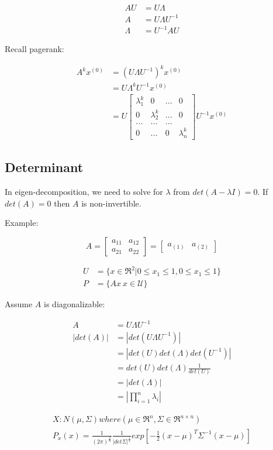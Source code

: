 \begin{align*}
AU &= U\Lambda\\
A &= U\Lambda U^{-1}\\
\Lambda &= U^{-1}AU
\end{align*}

Recall pagerank:

\begin{align*}
A^kx^{(0)} &= (U\Lambda U^{-1})^kx^{(0)}\\
&=U\Lambda^kU^{-1}x^{(0)} \\
&= U
\begin{bmatrix}
\lambda_1^k & 0 & ... & 0\\
0& \lambda_2^k  &  ... & 0\\
...  & ...  &   ...& \\
0    &  ... &  0 & \lambda_n^k
\end{bmatrix} U^{-1}x^{(0)}
\end{align*}

\subsection{Determinant}

In eigen-decomposition, we need to solve for $\lambda$ from $det(A - \lambda I) = 0$. 
If $det(A) = 0$ then $A$ is non-invertible. 

Example:

$$A = 
\left[
\begin{matrix}
a_{11} & a_{12}\\
a_{21} & a_{22}
\end{matrix}
\right] =
\left[
\begin{matrix}
a_{(1)} & a_{(2)}
\end{matrix}
\right]
$$

\begin{align*}
U &= \{x\in \Re^2 | 0\leq x_1 \leq 1, 0\leq x_1 \leq 1 \}\\
P &= \{Ax \ x\in \mathcal{U}\} 
\end{align*}


\begin{figure}
	\centering
	\resizebox{7.5cm}{3cm}{}
	\caption{}
	\label{}
\end{figure}

Assume $A$ is diagonalizable:

\begin{align*}
A &= U\Lambda U^{-1}\\
|det(A)| &= |det(U\Lambda U^{-1})| \\
&= |det(U)det(\Lambda)det(U^{-1})|\\
&= det(U)det(\Lambda)\frac{1}{det(U)}\\
&= |det(\Lambda)|\\
&= |\prod^n_{i=1}\lambda_i|
\end{align*}

\begin{align*}
X: N(\mu, \Sigma)where(\mu \in \Re^n, \Sigma \in \Re^{n\times n})\\
P_x(x) = \frac{1}{(2\pi)^{\frac{2}{n}}}\frac{1}{|det\Sigma|^{\frac{1}{2}}}exp[-\frac{1}{2}(x - \mu)^T\Sigma^{-1}(x - \mu)]
\end{align*}

